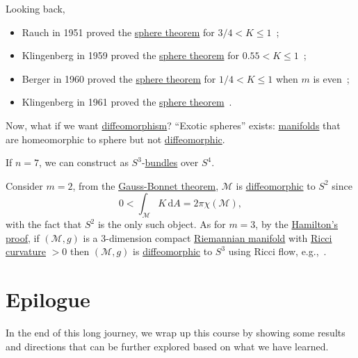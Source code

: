 Looking back,
\begin{itemize}
	\item Rauch in 1951 proved the \hyperref[thm:sphere*]{sphere theorem} for \(3 / 4 < K \leq 1\)~\cite{10.2307/1969309};
	\item Klingenberg in 1959 proved the \hyperref[thm:sphere*]{sphere theorem} for \(0.55 < K \leq 1\)~\cite{10.2307/1970029};
	\item Berger in 1960 proved the \hyperref[thm:sphere*]{sphere theorem} for \(1 / 4 < K \leq 1\) when \(m\) is even~\cite{berger1960varietes};
	\item Klingenberg in 1961 proved the \hyperref[thm:sphere*]{sphere theorem}~\cite{Klingenberg1961}.
\end{itemize}

Now, what if we want \hyperref[def:diffeomorphism]{diffeomorphism}? ``Exotic spheres'' exists: \hyperref[def:smooth-manifold]{manifolds} that are homeomorphic to sphere but not \hyperref[def:diffeomorphic]{diffeomorphic}.

\begin{eg}[J. Milnor]
	If \(n = 7\), we can construct as \(S^3\)-\hyperref[def:bundle]{bundles} over \(S^4\).
\end{eg}

Consider \(m = 2\), from the \hyperref[thm:Gauss-Bonnet]{Gauss-Bonnet theorem}, \(\mathcal{M} \) is \hyperref[def:diffeomorphic]{diffeomorphic} to \(S^2\) since
\[
	0 < \int _\mathcal{M} K \,\mathrm{d} A = 2 \pi \chi (\mathcal{M} ),
\]
with the fact that \(S^2\) is the only such object. As for \(m = 3\), by the \hyperref[thm:Hamilton]{Hamilton's proof}, if \((\mathcal{M} , g)\) is a \(3\)-dimension compact \hyperref[def:Riemannian-manifold]{Riemannian manifold} with \hyperref[def:Ricci-curvature]{Ricci curvature} \(> 0\) then \((\mathcal{M} , g)\) is \hyperref[def:diffeomorphic]{diffeomorphic} to \(S^3\) using Ricci flow, e.g.,~\cite{brendle2008manifolds}.

\chapter{Epilogue}
In the end of this long journey, we wrap up this course by showing some results and directions that can be further explored based on what we have learned.

